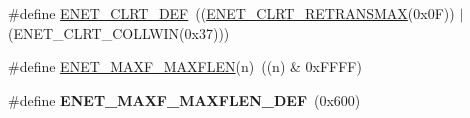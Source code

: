 \begin{DoxyCompactItemize}
\item 
\#define \hyperlink{group___e_n_e_t__17_x_x__40_x_x_ga3840d22e13373045c63bc14bb36800a6}{E\+N\+E\+T\+\_\+\+C\+L\+R\+T\+\_\+\+D\+E\+F}~((\hyperlink{group___e_n_e_t__17_x_x__40_x_x_ga2e261dd603d1a1909d1b00e11634a958}{E\+N\+E\+T\+\_\+\+C\+L\+R\+T\+\_\+\+R\+E\+T\+R\+A\+N\+S\+M\+A\+X}(0x0\+F)) $\vert$ (\+E\+N\+E\+T\+\_\+\+C\+L\+R\+T\+\_\+\+C\+O\+L\+L\+W\+I\+N(0x37)))
\item 
\#define \hyperlink{group___e_n_e_t__17_x_x__40_x_x_gafa842b5b6e26b8e4890fcedf64d52a9a}{E\+N\+E\+T\+\_\+\+M\+A\+X\+F\+\_\+\+M\+A\+X\+F\+L\+E\+N}(n)~((n) \& 0x\+F\+F\+F\+F)
\item 
\hypertarget{group___e_n_e_t__17_x_x__40_x_x_ga0b6f202981cfa586090cd4f29b16eaea}{\#define {\bfseries E\+N\+E\+T\+\_\+\+M\+A\+X\+F\+\_\+\+M\+A\+X\+F\+L\+E\+N\+\_\+\+D\+E\+F}~(0x600)}\label{group___e_n_e_t__17_x_x__40_x_x_ga0b6f202981cfa586090cd4f29b16eaea}


\end{DoxyCompactItemize}
